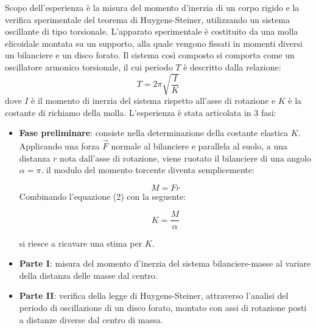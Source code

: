 Scopo dell’esperienza è la misura del momento d’inerzia di un corpo rigido e la verifica sperimentale del teorema di Huygens-Steiner, utilizzando un sistema oscillante di tipo torsionale. L’apparato sperimentale è costituito da una molla elicoidale montata su un supporto, alla quale vengono fissati in momenti diversi un bilanciere e un disco forato. Il sistema così composto si comporta come un oscillatore armonico torsionale, il cui periodo $T$ è descritto dalla relazione:
\begin{equation}
	T=2\pi\sqrt{\frac{I}{K}}
\end{equation}
dove $I$ è il momento di inerzia del sistema rispetto all’asse di rotazione e $K$ è la costante di richiamo della molla. L'esperienza è stata articolata in 3 fasi:

\begin{itemize}
    \item \textbf{Fase preliminare}: consiste nella determinazione della costante elastica $K$. Applicando una forza $\vec{F}$ normale al bilanciere e parallela al suolo, a una distanza $r$ nota dall'asse di rotazione, viene ruotato il bilanciere di una angolo $\alpha = \pi$. il modulo del momento torcente diventa semplicemente:

    \begin{equation}
    	M = Fr
    \end{equation}
    Combinando l'equazione (2) con la seguente:

    \begin{equation}
        K=\frac{M}{\alpha}
    \end{equation}

    si riesce a ricavare una stima per $K$.
    \item \textbf{Parte I}: misura del momento d’inerzia del sistema bilanciere-masse al variare della distanza delle masse dal centro. 
    \item \textbf{Parte II}: verifica della legge di Huygens-Steiner, attraverso l’analisi del periodo di oscillazione di un disco forato, montato con assi di rotazione posti a distanze diverse dal centro di massa.
\end{itemize}